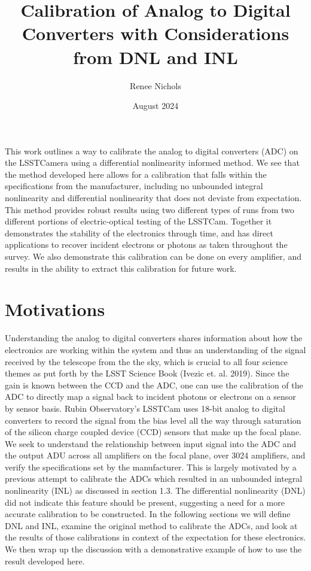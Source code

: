 \documentclass[11pt, letterpaper]{article}
\title{Calibration of Analog to Digital Converters with Considerations from DNL and INL}
\author{Renee Nichols}
\date{August 2024}
\begin{document}
\maketitle 

This work outlines a way to calibrate the analog to digital converters (ADC) on the LSSTCamera using a differential nonlinearity informed method. 
We see that the method developed here allows for a calibration that falls within the specifications from the manufacturer, including no unbounded integral nonlinearity and differential nonlinearity that does not deviate from expectation. 
This method provides robust results using two different types of runs from two different portions of electric-optical testing of the LSSTCam. 
Together it demonstrates the stability of the electronics through time, and has direct applications to recover incident electrons or photons as taken throughout the survey. 
We also demonstrate this calibration can be done on every amplifier, and results in the ability to extract this calibration for future work. 

\section{Motivations}
\indent

 
Understanding the analog to digital converters shares information about how the electronics are working within the system and thus an understanding of the signal received by the telescope from the the sky, which is crucial to all four science themes as put forth by the LSST Science Book (Ivezic et. al. 2019). 
Since the gain is known between the CCD and the ADC, one can use the calibration of the ADC to directly map a signal back to incident photons or electrons on a sensor by sensor basis.
Rubin Observatory’s LSSTCam uses 18-bit analog to digital converters to record the signal from the bias level all the way through saturation of the silicon charge coupled device (CCD) sensors that make up the focal plane. 
We seek to understand the relationship between input signal into the ADC and the output ADU across all amplifiers on the focal plane, over 3024 amplifiers, and verify the specifications set by the manufacturer. 
This is largely motivated by a previous attempt to calibrate the ADCs which resulted in an unbounded integral nonlinearity (INL) as discussed in section 1.3. 
The differential nonlinearity (DNL) did not indicate this feature should be present, suggesting a need for a more accurate calibration to be constructed. 
In the following sections we will define DNL and INL, examine the original method to calibrate the ADCs, and look at the results of those calibrations in context of the expectation for these electronics. 
We then wrap up the discussion with a demonstrative example of how to use the result developed here. 
\end{document}
